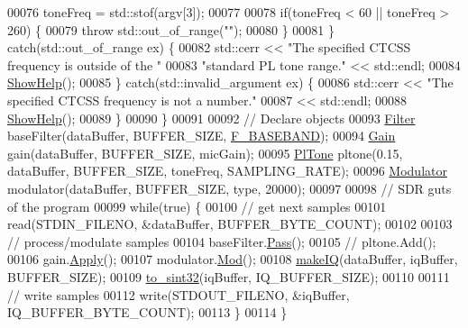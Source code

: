 \begin{DoxyCode}
00076             toneFreq = std::stof(argv[3]);
00077 
00078             \textcolor{keywordflow}{if}(toneFreq < 60 || toneFreq > 260) \{
00079                 \textcolor{keywordflow}{throw} std::out\_of\_range(\textcolor{stringliteral}{""});
00080             \}
00081         \} \textcolor{keywordflow}{catch}(std::out\_of\_range ex) \{
00082             std::cerr << \textcolor{stringliteral}{"The specified CTCSS frequency is outside of the "}
00083                 \textcolor{stringliteral}{"standard PL tone range."} << std::endl;
00084             \hyperlink{namespaceradio_a6db7c682d0f9aeac8cb5042717b8ae7f}{ShowHelp}();
00085         \} \textcolor{keywordflow}{catch}(std::invalid\_argument ex) \{
00086             std::cerr << \textcolor{stringliteral}{"The specified CTCSS frequency is not a number."}
00087                 << std::endl;
00088             \hyperlink{namespaceradio_a6db7c682d0f9aeac8cb5042717b8ae7f}{ShowHelp}();
00089         \}
00090     \}
00091 
00092     \textcolor{comment}{// Declare objects}
00093     \hyperlink{classradio_1_1Filter}{Filter} baseFilter(dataBuffer, BUFFER\_SIZE, \hyperlink{namespaceradio_a9bd902e9216499953a5906de73dc1796}{F\_BASEBAND});
00094     \hyperlink{classradio_1_1Gain}{Gain} gain(dataBuffer, BUFFER\_SIZE, micGain);
00095     \hyperlink{classradio_1_1PlTone}{PlTone} pltone(0.15, dataBuffer, BUFFER\_SIZE, toneFreq, SAMPLING\_RATE);
00096     \hyperlink{classradio_1_1Modulator}{Modulator} modulator(dataBuffer, BUFFER\_SIZE, type, 20000);
00097 
00098     \textcolor{comment}{// SDR guts of the program}
00099     \textcolor{keywordflow}{while}(\textcolor{keyword}{true}) \{
00100         \textcolor{comment}{// get next samples}
00101         read(STDIN\_FILENO, &dataBuffer, BUFFER\_BYTE\_COUNT);
00102         
00103         \textcolor{comment}{// process/modulate samples}
00104         baseFilter.\hyperlink{classradio_1_1Filter_ad2793821801780809af385463bf8f197}{Pass}();
00105 \textcolor{comment}{//      pltone.Add();}
00106         gain.\hyperlink{classradio_1_1Gain_a8c6df2c5989da0e560c8f276e6138a2d}{Apply}();
00107         modulator.\hyperlink{classradio_1_1Modulator_ab5eac6e4900579486b5871b48e64cdab}{Mod}();
00108         \hyperlink{namespaceradio_a7166522e76ff88e8d482491b1b6e2275}{makeIQ}(dataBuffer, iqBuffer, BUFFER\_SIZE);
00109         \hyperlink{namespaceradio_ae4b2334c4366dcdf0311ad79d2067945}{to\_sint32}(iqBuffer, IQ\_BUFFER\_SIZE);
00110         
00111         \textcolor{comment}{// write samples}
00112         write(STDOUT\_FILENO, &iqBuffer, IQ\_BUFFER\_BYTE\_COUNT);
00113     \}
00114 \}
\end{DoxyCode}
